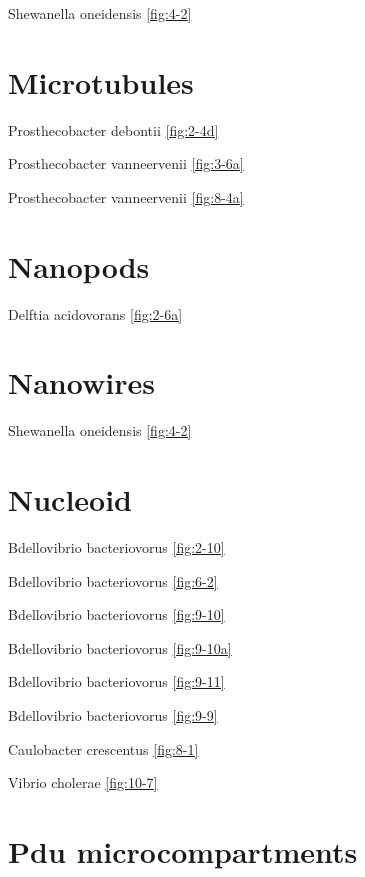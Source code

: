 \documentclass[]{tufte-book}
\begin{document}
Shewanella oneidensis \ref{fig:4-2}

\hypertarget{microtubules}{%
\section*{Microtubules}\label{microtubules}}

Prosthecobacter debontii \ref{fig:2-4d}

Prosthecobacter vanneervenii \ref{fig:3-6a}

Prosthecobacter vanneervenii \ref{fig:8-4a}

\hypertarget{nanopods}{%
\section*{Nanopods}\label{nanopods}}

Delftia acidovorans \ref{fig:2-6a}

\hypertarget{nanowires-1}{%
\section*{Nanowires}\label{nanowires-1}}

Shewanella oneidensis \ref{fig:4-2}

\hypertarget{nucleoid-1}{%
\section*{Nucleoid}\label{nucleoid-1}}

Bdellovibrio bacteriovorus \ref{fig:2-10}

Bdellovibrio bacteriovorus \ref{fig:6-2}

Bdellovibrio bacteriovorus \ref{fig:9-10}

Bdellovibrio bacteriovorus \ref{fig:9-10a}

Bdellovibrio bacteriovorus \ref{fig:9-11}

Bdellovibrio bacteriovorus \ref{fig:9-9}

Caulobacter crescentus \ref{fig:8-1}

Vibrio cholerae \ref{fig:10-7}

\hypertarget{pdu-microcompartments}{%
\section*{Pdu microcompartments}\label{pdu-microcompartments}}
\end{document}

